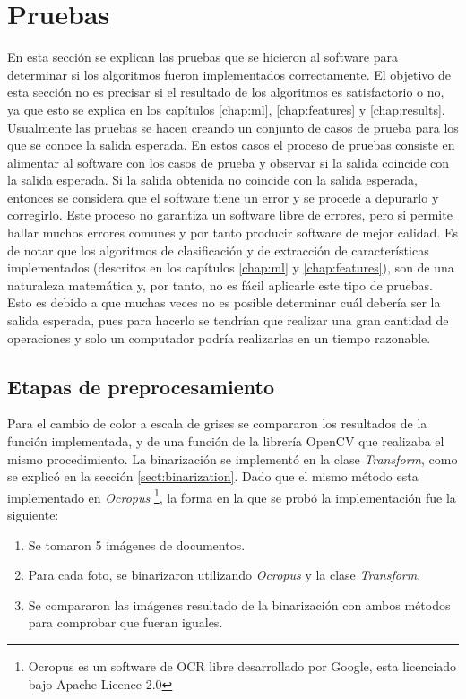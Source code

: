 \documentclass[a4paper, 11pt, oneside]{report}
\begin{document}
\section{Pruebas}
En esta sección se explican las pruebas que se hicieron al software para determinar si los algoritmos fueron implementados correctamente. El objetivo de esta sección no es precisar si el resultado de los algoritmos es satisfactorio o no, ya que esto se explica en los capítulos \ref{chap:ml}, \ref{chap:features} y \ref{chap:results}.
Usualmente las pruebas se hacen creando un conjunto de casos de prueba para los que se conoce la salida esperada. En estos casos el proceso de pruebas consiste en alimentar al software con los casos de prueba y observar si la salida coincide con la salida esperada. Si la salida obtenida no coincide con la salida esperada, entonces se considera que el software tiene un error y se procede a depurarlo y corregirlo. Este proceso no garantiza un software libre de errores, pero si permite hallar muchos errores comunes y por tanto producir software de mejor calidad. Es de notar que los algoritmos de clasificación y de extracción de características implementados (descritos en los capítulos \ref{chap:ml} y \ref{chap:features}), son de una naturaleza matemática y, por tanto, no es fácil aplicarle este tipo de pruebas. Esto es debido a que muchas veces no es posible determinar cuál debería ser la salida esperada, pues para hacerlo se tendrían que realizar una gran cantidad de operaciones y solo un computador podría realizarlas en un tiempo razonable. 
\subsection{Etapas de preprocesamiento}
Para el cambio de color a escala de grises se compararon los resultados de la función implementada, y de una función de la librería OpenCV que realizaba el mismo procedimiento. La binarización se implementó en la clase {\it Transform}, como se explicó en la sección \ref{sect:binarization}. Dado que el mismo método esta implementado en {\it Ocropus} \footnote{Ocropus es un software de OCR libre desarrollado por Google, esta licenciado bajo Apache Licence 2.0}, la forma en la que se probó la implementación fue la siguiente:
\begin{enumerate}
\item Se tomaron 5 imágenes de documentos.
\item Para cada foto, se binarizaron utilizando {\it Ocropus} y la clase {\it Transform}.
\item Se compararon las imágenes resultado de la binarización con ambos métodos para comprobar que fueran iguales.
\end{enumerate}
\end{document}
